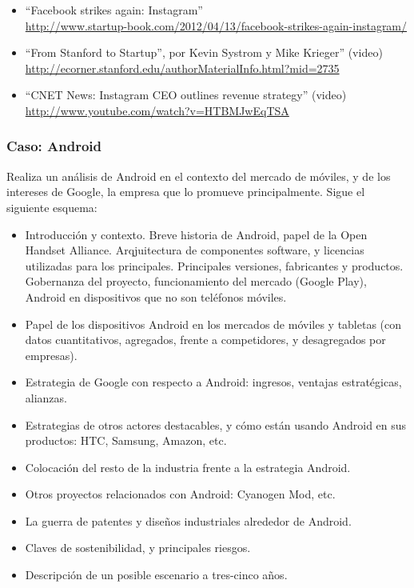 \documentclass[a4paper,12pt]{article}
\begin{document}
\begin{itemize}
\item ``Facebook strikes again: Instagram'' \\
  \url{http://www.startup-book.com/2012/04/13/facebook-strikes-again-instagram/}

\item ``From Stanford to Startup'', por Kevin Systrom y Mike Krieger'' (video) \\
  \url{http://ecorner.stanford.edu/authorMaterialInfo.html?mid=2735}

\item ``CNET News: Instagram CEO outlines revenue strategy'' (video) \\
  \url{http://www.youtube.com/watch?v=HTBMJwEqTSA}

\end{itemize}

\subsubsection{Caso: Android}
\label{sub:case-android}

Realiza un análisis de Android en el contexto del mercado de móviles, y de los intereses de Google, la empresa que lo promueve principalmente. Sigue el siguiente esquema:

\begin{itemize}
\item Introducción y contexto. Breve historia de Android, papel de la Open Handset Alliance. Arqjuitectura de componentes software, y licencias utilizadas para los principales. Principales versiones, fabricantes y productos. Gobernanza del proyecto, funcionamiento del mercado (Google Play), Android en dispositivos que no son teléfonos móviles.
\item Papel de los dispositivos Android en los mercados de móviles y tabletas (con datos cuantitativos, agregados, frente a competidores, y desagregados por empresas).
\item Estrategia de Google con respecto a Android: ingresos, ventajas estratégicas, alianzas.
\item Estrategias de otros actores destacables, y cómo están usando Android en sus productos: HTC, Samsung, Amazon, etc.
\item Colocación del resto de la industria frente a la estrategia Android.
\item Otros proyectos relacionados con Android: Cyanogen Mod, etc.
\item La guerra de patentes y diseños industriales alrededor de Android.
\item Claves de sostenibilidad, y principales riesgos.
\item Descripción de un posible escenario a tres-cinco años.
\end{itemize}
\end{document}
